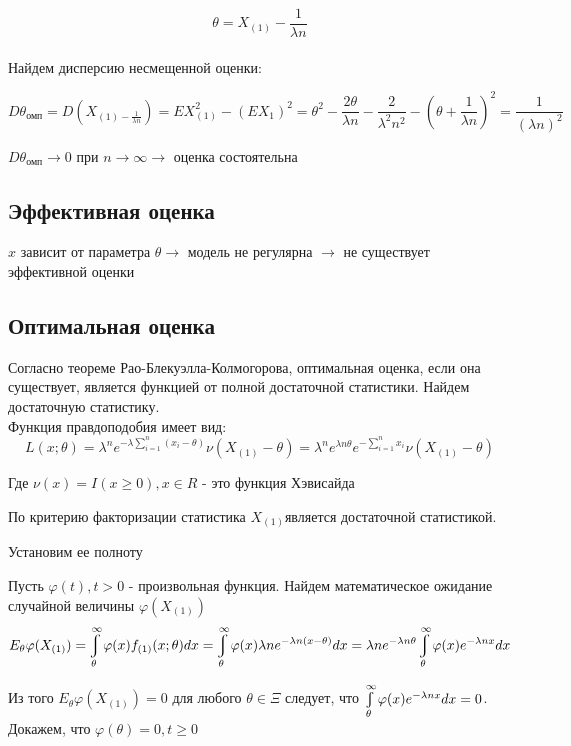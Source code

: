 \documentclass[a4paper,12pt, oneside]{book}
\let\int\varint
\begin{document}
$$
\theta = X_{(1)} - \frac{1}{\lambda n}
$$
\\

Найдем дисперсию несмещенной оценки:

$$
D\theta_\text{омп} = D\left( X_{(1) - \frac{1}{\lambda n}}\right) = EX_{(1)}^2 - (EX_{1})^2 = \theta^2 - \dfrac{2 \theta}{\lambda n} - \dfrac{2}{\lambda^2 n^2} - \left( \theta + \dfrac{1}{\lambda n}\right)^2 = \dfrac{1}{(\lambda n)^2}
$$

$D\theta_\text{омп} \to 0  $ при $ n \to \infty \to $ оценка состоятельна

\subsection{Эффективная оценка}

$ x $ зависит от параметра $\theta \to$ модель не регулярна $ \to $ не существует эффективной оценки 

\subsection{Оптимальная оценка}

Согласно теореме Рао-Блекуэлла-Колмогорова, оптимальная оценка, если она существует, является
функцией от полной достаточной статистики. Найдем достаточную статистику.
\\

Функция правдоподобия имеет вид:
$$
L(x;\theta) = \lambda^n e^{-\lambda \sum_{i=1}^n (x_i - \theta)} \nu (X_{(1)} - \theta) = \lambda^n e^{\lambda n \theta} e^{-\sum_{i=1}^{n} x_i} \nu(X_{(1)} - \theta) 
$$

Где $ \nu(x) = I(x \geq 0), x \in R $ - это функция Хэвисайда

По критерию факторизации статистика $ X_{(1)} $является достаточной статистикой. 

Установим ее полноту

Пусть $ \varphi(t), t > 0 $ - произвольная функция. Найдем математическое ожидание случайной величины $ \varphi(X_{(1)}) $
$$
E_{\theta} \varphi(X_{(1)}) = \int\limits_{\theta}^{\infty} \varphi(x) f_{(1)}(x; \theta) dx = \int\limits_{\theta}^\infty \varphi(x) \lambda n e^{- \lambda n(x - \theta)} dx = \lambda n e^{- \lambda n \theta} \int\limits_{\theta}^{\infty} \varphi(x) e^{- \lambda n x} dx
$$

Из того $ E_\theta \varphi(X_{(1)}) = 0 $ для любого $\theta \in \Xi$ следует, что  $ \int\limits_{\theta}^{\infty} \varphi(x) e^{-\lambda n x} dx = 0$. Докажем, что $ \varphi(\theta)  = 0, t \geq 0$
\\
\end{document}

